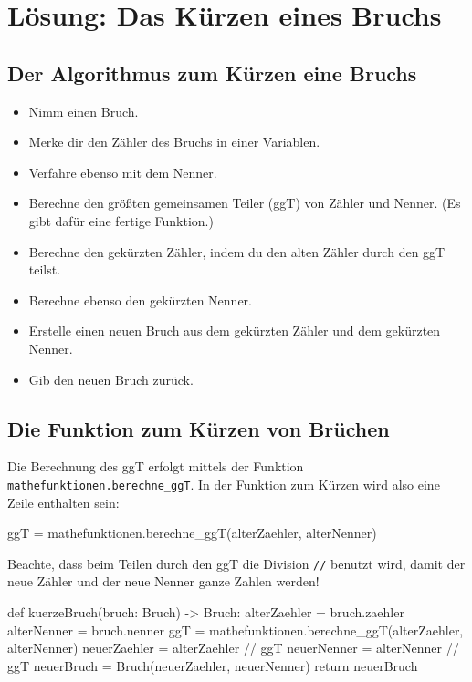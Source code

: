 \section{Lösung: Das Kürzen eines Bruchs}

\subsection*{Der Algorithmus zum Kürzen eine Bruchs}

\begin{itemize}
	\item Nimm einen Bruch.
	\item Merke dir den Zähler des Bruchs in einer Variablen.
	\item Verfahre ebenso mit dem Nenner.
	\item Berechne den größten gemeinsamen Teiler (ggT) von Zähler und Nenner. (Es gibt dafür eine fertige Funktion.)
	\item Berechne den gekürzten Zähler, indem du den alten Zähler durch den ggT teilst. 
	\item Berechne ebenso den gekürzten Nenner.
	\item Erstelle einen neuen Bruch aus dem gekürzten Zähler und dem gekürzten Nenner.
	\item Gib den neuen Bruch zurück.
\end{itemize}

\subsection*{Die Funktion zum Kürzen von Brüchen}

Die Berechnung des ggT erfolgt mittels der Funktion \texttt{mathefunktionen.berechne\_ggT}. In der Funktion zum Kürzen wird also eine Zeile enthalten sein:

\begin{codePython}
ggT = mathefunktionen.berechne_ggT(alterZaehler, alterNenner)
\end{codePython}

Beachte, dass beim Teilen durch den ggT die Division \texttt{//} benutzt wird, damit der neue Zähler und der neue Nenner ganze Zahlen werden!

\begin{codePython}
def kuerzeBruch(bruch: Bruch) -> Bruch:
	alterZaehler = bruch.zaehler
	alterNenner = bruch.nenner
	ggT = mathefunktionen.berechne_ggT(alterZaehler, alterNenner)
	neuerZaehler = alterZaehler // ggT
	neuerNenner = alterNenner // ggT
	neuerBruch = Bruch(neuerZaehler, neuerNenner)
	return neuerBruch
\end{codePython}

